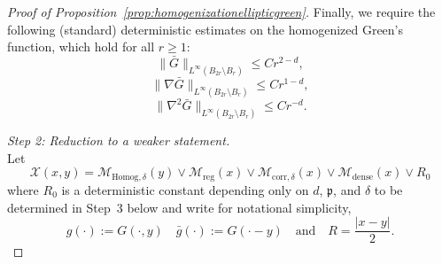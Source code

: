 \documentclass[12pt]{amsart}
\numberwithin{equation}{section}
\begin{document}
\begin{proof}[Proof of Proposition~\ref{prop:homogenizationellipticgreen}]
		Finally, we require the following (standard) deterministic estimates on the homogenized Green's function,
		which hold for all $r \geq 1$:
		\begin{equation} \label{eq:decay-estimate}
			\| \bar{G}\|_{L^\infty(B_{2r} \setminus B_r)} \leq C r^{2-d},
		\end{equation}
		\begin{equation} \label{eq:green-gradient-estimate}
			\| \nabla \bar{G}\|_{L^\infty(B_{2r} \setminus B_r)} \leq C r^{1-d},
		\end{equation}
		\begin{equation} \label{eq:green-hessian-estimate}
			\| \nabla^2 \bar{G}\|_{L^\infty(B_{2r} \setminus B_r)} \leq C r^{-d}.
		\end{equation}
		
		
		
		\medskip
		{\it Step 2: Reduction to a weaker statement.} \\
		Let 
		\begin{equation} \label{eq:choice-of-minimal-scale}
			\mathcal{X}(x,y) = \mathcal{M}_{\mathrm{Homog}, \delta}(y) \vee \mathcal{M}_{\mathrm{reg}}(x) \vee \mathcal{M}_{\mathrm{corr}, \delta}(x) \vee \mathcal{M}_{\mathrm{dense}}(x) \vee R_0
		\end{equation}
		where $R_0$ is a deterministic constant depending only on $d$, $\mathfrak{p}$, and $\delta$ to be determined in Step~3 below
		and write for notational simplicity, 
		\[
		g(\cdot) := G(\cdot, y) \quad \bar{g}(\cdot) := G(\cdot-y) \quad \mbox{and} \quad R = \frac{|x-y|}{2}. 
		\]
		

\end{proof}
\end{document}
